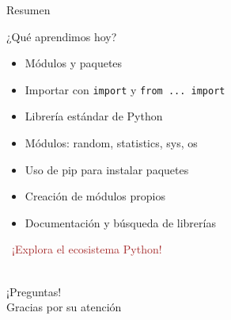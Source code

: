 \documentclass{beamer}
\begin{document}
\begin{frame}{Resumen \faListUl}
\begin{conceptbox}{¿Qué aprendimos hoy?}
\small
\begin{itemize}
    \item[\faCheck] Módulos y paquetes
    \item[\faCheck] Importar con \texttt{import} y \texttt{from ... import}
    \item[\faCheck] Librería estándar de Python
    \item[\faCheck] Módulos: random, statistics, sys, os
    \item[\faCheck] Uso de pip para instalar paquetes
    \item[\faCheck] Creación de módulos propios
    \item[\faCheck] Documentación y búsqueda de librerías
\end{itemize}
\end{conceptbox}

\vspace{0.3cm}
\begin{center}
\large\textcolor{brown}{\faBoxOpen\ ¡Explora el ecosistema Python!}
\end{center}
\end{frame}

\begin{frame}
\begin{center}
\Huge\textcolor{brown}{\faQuestionCircle}\\
\vspace{0.5cm}
\Huge ¡Preguntas!\\
\vspace{1cm}
\Large\textcolor{brownbright}{Gracias por su atención}
\end{center}
\end{frame}
\end{document}
